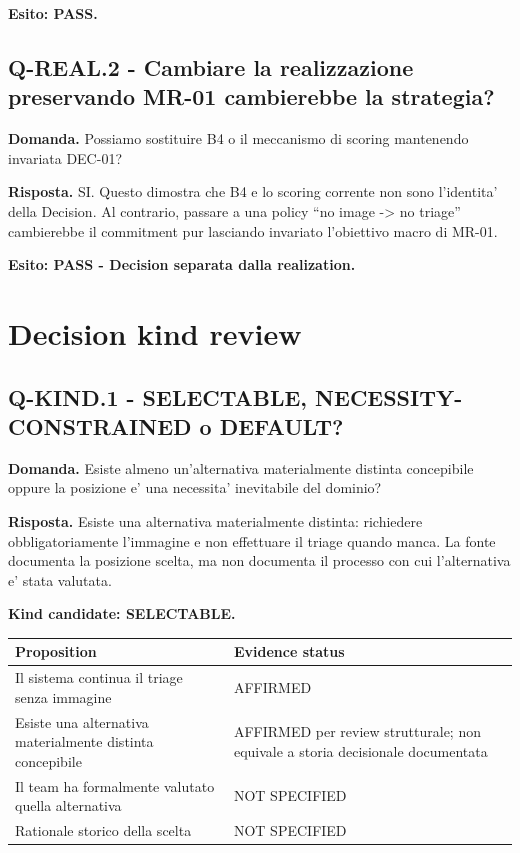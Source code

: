 \documentclass[11pt,a4paper]{article}
\begin{document}
\textbf{Esito: PASS.}

\subsection{Q-REAL.2 - Cambiare la realizzazione preservando MR-01 cambierebbe la strategia?}
\begin{ddtacheck}
\textbf{Domanda.} Possiamo sostituire B4 o il meccanismo di scoring mantenendo invariata DEC-01?
\end{ddtacheck}

\textbf{Risposta.} SI. Questo dimostra che B4 e lo scoring corrente non sono l'identita' della Decision. Al contrario, passare a una policy ``no image -> no triage'' cambierebbe il commitment pur lasciando invariato l'obiettivo macro di MR-01.

\textbf{Esito: PASS - Decision separata dalla realization.}

\section{Decision kind review}

\subsection{Q-KIND.1 - SELECTABLE, NECESSITY-CONSTRAINED o DEFAULT?}
\begin{ddtacheck}
\textbf{Domanda.} Esiste almeno un'alternativa materialmente distinta concepibile oppure la posizione e' una necessita' inevitabile del dominio?
\end{ddtacheck}

\textbf{Risposta.} Esiste una alternativa materialmente distinta: richiedere obbligatoriamente l'immagine e non effettuare il triage quando manca. La fonte documenta la posizione scelta, ma non documenta il processo con cui l'alternativa e' stata valutata.

\textbf{Kind candidate: SELECTABLE.}

\begin{tabularx}{\textwidth}{L{55mm}Y}
\toprule
\textbf{Proposition} & \textbf{Evidence status} \\
\midrule
Il sistema continua il triage senza immagine & AFFIRMED \\
Esiste una alternativa materialmente distinta concepibile & AFFIRMED per review strutturale; non equivale a storia decisionale documentata \\
Il team ha formalmente valutato quella alternativa & NOT SPECIFIED \\
Rationale storico della scelta & NOT SPECIFIED \\
\bottomrule
\end{tabularx}
\end{document}
